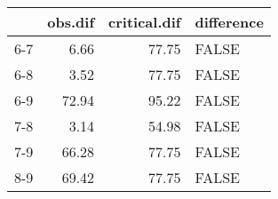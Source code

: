 \begin{table}[ht]
\centering
\begin{tabular}{rrrl}
  \hline
 & obs.dif & critical.dif & difference \\ 
  \hline
6-7 & 6.66 & 77.75 & FALSE \\ 
  6-8 & 3.52 & 77.75 & FALSE \\ 
  6-9 & 72.94 & 95.22 & FALSE \\ 
  7-8 & 3.14 & 54.98 & FALSE \\ 
  7-9 & 66.28 & 77.75 & FALSE \\ 
  8-9 & 69.42 & 77.75 & FALSE \\ 
   \hline
\end{tabular}
\end{table}
